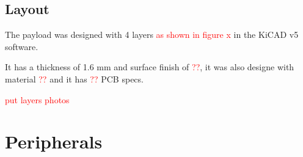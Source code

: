 \subsection{Layout}

The payload was designed with 4 layers \textcolor{red}{as shown in figure x} in the KiCAD v5 software.

It has a thickness of 1.6 mm and surface finish of \textcolor{red}{??}, it was also designe with material \textcolor{red}{??} and it has \textcolor{red}{??} PCB specs. 

\textcolor{red}{put layers photos}

\section{Peripherals}
